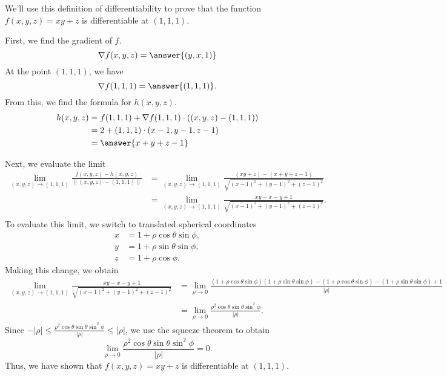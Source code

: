 \documentclass{ximera}
\begin{document}
\begin{example}
We'll use this definition of differentiability to prove that the function $f(x,y,z) = xy+z$ is differentiable at $(1,1,1)$.

First, we find the gradient of $f$.
\[
\nabla f(x,y,z) = \answer{(y,x,1)}
\]
At the point $(1,1,1)$, we have
\[
\nabla f(1,1,1) = \answer{(1,1,1)}.
\]
From this, we find the formula for $h(x,y,z)$.
\begin{align*}
h(x,y,z) &= f(1,1,1)+\nabla f(1,1,1)\cdot ((x,y,z)-(1,1,1))\\
&= 2+(1,1,1)\cdot (x-1,y-1,z-1)\\
&= \answer{x+y+z-1}
\end{align*}

Next, we evaluate the limit
\begin{align*}
\lim_{(x,y,z)\rightarrow (1,1,1)}\frac{f(x,y,z) - h(x,y,z)}{\|(x,y,z)-(1,1,1)\|} &= \lim_{(x,y,z)\rightarrow (1,1,1)}\frac{(xy+z) - (x+y+z-1)}{\sqrt{(x-1)^2+(y-1)^2+(z-1)^2}}\\
&= \lim_{(x,y,z)\rightarrow (1,1,1)}\frac{xy-x-y+1}{\sqrt{(x-1)^2+(y-1)^2+(z-1)^2}}.\\
\end{align*}
To evaluate this limit, we switch to translated spherical coordinates
\begin{align*}
x &= 1+\rho\cos\theta\sin\phi,\\
y &= 1+\rho\sin\theta\sin\phi,\\
z &= 1+\rho\cos\phi.
\end{align*}
Making this change, we obtain
\begin{align*}
\lim_{(x,y,z)\rightarrow (1,1,1)}\frac{xy-x-y+1}{\sqrt{(x-1)^2+(y-1)^2+(z-1)^2}} &= \lim_{\rho\rightarrow 0}\frac{(1+\rho\cos\theta\sin\phi)(1+\rho\sin\theta\sin\phi) - (1+\rho\cos\theta\sin\phi) - (1+\rho\sin\theta\sin\phi) + 1}{|\rho|}\\
&= \lim_{\rho\rightarrow 0}\frac{\rho^2\cos\theta\sin\theta\sin^2\phi}{|\rho|}.
\end{align*}
Since $-|\rho|\leq \frac{\rho^2\cos\theta\sin\theta\sin^2\phi}{|\rho|} \leq |\rho|$, we use the squeeze theorem to obtain
\[
\lim_{\rho\rightarrow 0}\frac{\rho^2\cos\theta\sin\theta\sin^2\phi}{|\rho|} =0.
\]
Thus, we have shown that $f(x,y,z) = xy+z$ is differentiable at $(1,1,1)$.
\end{example}
\end{document}
